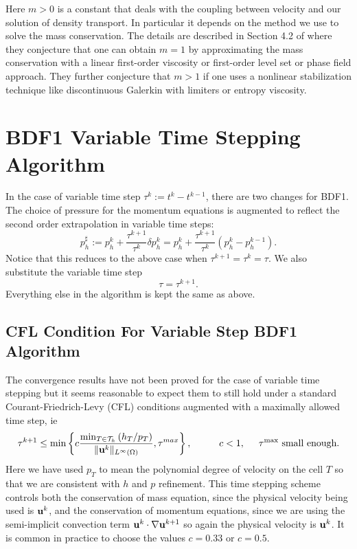 \documentclass[letterpaper]{erdc}
\begin{document}
\begin{remark}
  Here $m>0$ is a constant that deals with the coupling between velocity and our solution of density transport.  In particular it depends on the method we use to solve the mass conservation.  The details are described in Section 4.2 of \cite{guermond2011error} where they conjecture that one can obtain $m=1$ by approximating the mass conservation with a linear first-order viscosity or first-order level set or phase field approach.  They further conjecture that $m>1$ if one uses a nonlinear stabilization technique like discontinuous Galerkin with limiters or entropy viscosity.  
\end{remark}


%
%
\section{BDF1 Variable Time Stepping Algorithm}\label{sec:BDF1VariableTimeSteppingAlgorithm}
In the case of variable time step  $\tau^{k} := t^{k}-t^{k-1}$, there are two changes for BDF1.  The choice of pressure for the momentum equations is augmented to reflect the second order extrapolation in variable time steps:
\begin{equation}
  p^{\sharp}_h := p_h^{k} + \frac{\tau^{k+1}}{\tau^{k}}\delta p_h^{k} = p_h^{k} + \frac{\tau^{k+1}}{\tau^{k}}\left( p_h^{k} - p_h^{k-1} \right).
\end{equation}
Notice that this reduces to the above case when $\tau^{k+1}=\tau^{k} = \tau$.  We also substitute the variable time step
\begin{equation}
  \tau =\tau^{k+1}.
\end{equation}
Everything else in the algorithm is kept the same as above.

\subsection{CFL Condition For Variable Step BDF1 Algorithm}\label{sec:CFLBDF1}
The convergence results have not been proved for the case of variable time stepping but it seems reasonable to expect them to still hold under a standard Courant-Friedrich-Levy (CFL) conditions augmented with a maximally allowed time step, ie
\begin{equation}
  \tau^{k+1} \leq \min \left\{c \frac{\min_{T\in\mathcal{T}_h}\left(h_{T}/p_T\right)}{\|\textbf{u}^{k}\|_{L^{\infty}(\Omega)}}, \tau^{max}\right\}, \hspace{1cm} c<1, \hspace{0.5cm}\tau^{\max} \mbox{ small enough}.
\end{equation}
Here we have used $p_T$ to mean the polynomial degree of velocity on the cell $T$ so that we are consistent with $h$ and $p$ refinement.  This time stepping scheme controls both the conservation of mass equation, since the physical velocity being used is $\textbf{u}^{k}$, and the conservation of momentum equations, since we are using the semi-implicit convection term $\textbf{u}^{k}\cdot\nabla\textbf{u}^{k+1}$ so again the physical velocity is $\textbf{u}^{k}$.  It is common in practice to choose the values $c=0.33$ or $c=0.5$.
\end{document}
